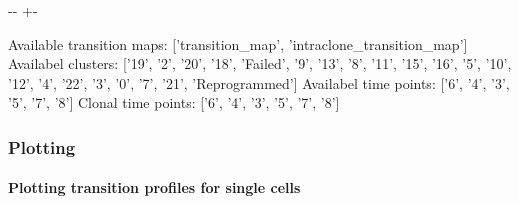 \documentclass[letterpaper,10pt,english]{sphinxmanual}
\newlength\nbsphinxcodecellspacing
\begin{document}
{
\begin{sphinxVerbatim}[commandchars=\\\{\}]
\llap{\color{nbsphinxin}[13]:\,\hspace{\fboxrule}\hspace{\fboxsep}}
\end{sphinxVerbatim}
}

{

\kern-\sphinxverbatimsmallskipamount\kern-\baselineskip
\kern+\FrameHeightAdjust\kern-\fboxrule
\vspace{\nbsphinxcodecellspacing}

\begin{sphinxVerbatim}[commandchars=\\\{\}]
Available transition maps: ['transition\_map', 'intraclone\_transition\_map']
Availabel clusters: ['19', '2', '20', '18', 'Failed', '9', '13', '8', '11', '15', '16', '5', '10', '12', '4', '22', '3', '0', '7', '21', 'Reprogrammed']
Availabel time points: ['6', '4', '3', '5', '7', '8']
Clonal time points: ['6', '4', '3', '5', '7', '8']
\end{sphinxVerbatim}
}


\subsubsection{Plotting}
\label{\detokenize{20210121_reprogramming_data_no_merge_tags:Plotting}}

\paragraph{Plotting transition profiles for single cells}
\label{\detokenize{20210121_reprogramming_data_no_merge_tags:Plotting-transition-profiles-for-single-cells}}
{
\begin{sphinxVerbatim}[commandchars=\\\{\}]
\llap{\color{nbsphinxin}[14]:\,\hspace{\fboxrule}\hspace{\fboxsep}}\PYG{p}{[}\PYG{p}{]}

\end{sphinxVerbatim}
}
\end{document}
